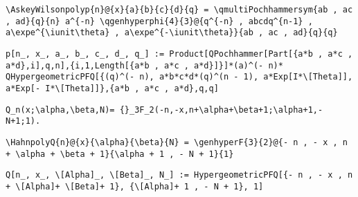 \newsavebox\CHST
\begin{lrbox}{\CHST}
 \begin{minipage}[t]{0.82\textwidth}
  \lstinline[language={[latex]TeX},mathescape,breaklines=true]"\AskeyWilsonpolyp{n}@{x}{a}{b}{c}{d}{q} = \qmultiPochhammersym{ab , ac , ad}{q}{n} a^{-n} \qgenhyperphi{4}{3}@{q^{-n} , abcdq^{n-1} , a\expe^{\iunit\theta} , a\expe^{-\iunit\theta}}{ab , ac , ad}{q}{q}"
 \end{minipage}
\end{lrbox}
\newsavebox\CHMM
\begin{lrbox}{\CHMM}
 \begin{minipage}[t]{0.82\textwidth}
  \lstinline[language={[latex]TeX},mathescape,breaklines=true]"p[n_, x_, a_, b_, c_, d_, q_] := Product[QPochhammer[Part[{a*b , a*c , a*d},i],q,n],{i,1,Length[{a*b , a*c , a*d}]}]*(a)^(- n)* QHypergeometricPFQ[{(q)^(- n), a*b*c*d*(q)^(n - 1), a*Exp[I*\[Theta]], a*Exp[- I*\[Theta]]},{a*b , a*c , a*d},q,q]"
 \end{minipage}
\end{lrbox}
\newsavebox\CHMA
\begin{lrbox}{\CHMA}
 \begin{minipage}[t]{0.82\textwidth}
  \lstinline[language={[latex]TeX},mathescape,breaklines=true]""
 \end{minipage}
\end{lrbox}
\newsavebox\CIT
\begin{lrbox}{\CIT}
 \begin{minipage}[t]{0.82\textwidth}
  \lstinline[language={[latex]TeX},mathescape,breaklines=true]"Q_n(x;\alpha,\beta,N)= {}_3F_2(-n,-x,n+\alpha+\beta+1;\alpha+1,-N+1;1)."
 \end{minipage}
\end{lrbox}
\newsavebox\CIST
\begin{lrbox}{\CIST}
 \begin{minipage}[t]{0.82\textwidth}
  \lstinline[language={[latex]TeX},mathescape,breaklines=true]"\HahnpolyQ{n}@{x}{\alpha}{\beta}{N} = \genhyperF{3}{2}@{- n , - x , n + \alpha + \beta + 1}{\alpha + 1 , - N + 1}{1}"
 \end{minipage}
\end{lrbox}
\newsavebox\CIMM
\begin{lrbox}{\CIMM}
 \begin{minipage}[t]{0.82\textwidth}
  \lstinline[language={[latex]TeX},mathescape,breaklines=true]"Q[n_, x_, \[Alpha]_, \[Beta]_, N_] := HypergeometricPFQ[{- n , - x , n + \[Alpha]+ \[Beta]+ 1}, {\[Alpha]+ 1 , - N + 1}, 1]"
 \end{minipage}
\end{lrbox}
